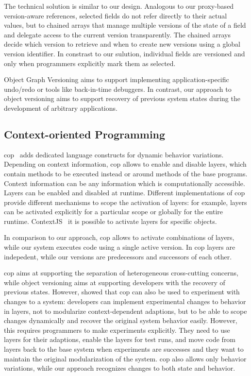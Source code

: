 The technical solution is similar to our design.
Analogous to our proxy-based version-aware references, selected fields do not refer directly to their actual values, but to chained arrays that manage multiple versions of the state of a field and delegate access to the current version transparently.
The chained arrays decide which version to retrieve and when to create new versions using a global version identifier.
In constrast to our sulution, individual fields are versioned and only when programmers explicitly mark them as selected.

Object Graph Versioning aims to support implementing application-specific undo/redo or tools like back-in-time debuggers.
In contrast, our approach to object versioning aims to support recovery of previous system states during the development of arbitrary applications.


\subsection{Context-oriented Programming}

\ac{cop}~\cite{Hirschfeld2008COP,Appeltauer2009CCP} adds dedicated language constructs for dynamic behavior variations.
Depending on context information, \ac{cop} allows to enable and disable layers, which contain methods to be executed instead or around methods of the base programs.
Context information can be any information which is computationally accessible.
Layers can be enabled and disabled at runtime.
Different implementations of \ac{cop} provide different mechanisms to scope the activation of layers: for example, layers can be activated explicitly for a particular scope or globally for the entire runtime.
ContextJS~\cite{Lincke2011OIC} it is possible to activate layers for specific objects.

In comparison to our approach, \ac{cop} allows to activate combinations of layers, while our system executes code using a single active version.
In \ac{cop} layers are indepedent, while our versions are predecessors and successors of each other.

\ac{cop} aims at supporting the separation of heterogeneous cross-cutting concerns, while object versioning aims at supporting developers with the recovery of previous states.
However, \cite{Lincke2012SCS} showed that \ac{cop} can also be used to experiment with changes to a system: developers can implement experimental changes to behavior in layers, not to modularize context-dependent adaptions, but to be able to scope changes dynamically and recover the original system behavior easily.
However, this requires programmers to make experiments explicitly.
They need to use layers for their adaptions, enable the layers for test runs, and move code from layers back to the base system when experiments are successes and they want to maintain the original modularization of the system.
\ac{cop} also allows only behavior variations, while our approach recognizes changes to both state and behavior.


